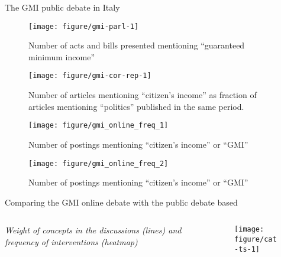 \documentclass[serif, aspectratio=169]{beamer}
\begin{document}
\begin{frame}
{The GMI public debate in Italy}

\begin{figure}
\texttt{[image: figure/gmi-parl-1]} \caption{Number of acts and bills presented mentioning \enquote{guaranteed minimum income}}
\end{figure}

\end{frame}

\begin{frame}

\begin{figure}
\texttt{[image: figure/gmi-cor-rep-1]} \caption{Number of articles mentioning \enquote{citizen's income} as fraction of articles mentioning \enquote{politics} published in the same period.}\label{fig:gmi-cor-rep}
\end{figure}

\end{frame}

\begin{frame}

\begin{figure}
\texttt{[image: figure/gmi\_online\_freq\_1]} \caption{Number of postings mentioning \enquote{citizen's income} or \enquote{GMI}}\label{fig:gmi-cor-rep}
\end{figure}

\end{frame}

\begin{frame}

\begin{figure}
\texttt{[image: figure/gmi\_online\_freq\_2]} \caption{Number of postings mentioning \enquote{citizen's income} or \enquote{GMI}}\label{fig:gmi-cor-rep}
\end{figure}

\end{frame}

\begin{frame}
{Comparing the GMI online debate with the public debate based}

\begin{columns}
\begin{column}{0.3\textwidth}
\textit{Weight of concepts in the discussions (lines) and frequency of interventions (heatmap)}
\end{column}
\begin{column}{0.7\textwidth}
\begin{figure}
\texttt{[image: figure/cat-ts-1]} 
\end{figure}
\end{column}
\end{columns}
\end{frame}
\end{document}
